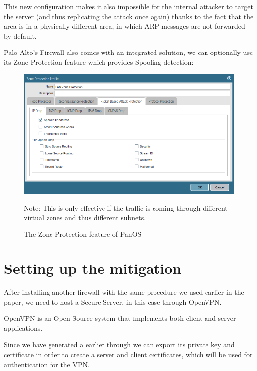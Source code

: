 This new configuration makes it also impossible for the internal attacker to target the  server (and thus replicating the attack once again) thanks to the fact that the  area is in a physically different area, in which ARP messages are not forwarded by default.

Palo Alto's Firewall also comes with an integrated  solution, we can optionally use its Zone Protection feature which provides  Spoofing detection:

\begin{figure}[h!]
 \centering
 \includegraphics[width=13.5cm]{img/zone_protection.png}
 \caption{The Zone Protection feature of PanOS}
 \label{fig: Zone Protection}

Note: This is only effective if the traffic is coming through different virtual zones and thus different subnets.

\end{figure}

\newpage

\section{Setting up the mitigation}

After installing another firewall with the same procedure we used earlier in the paper, we need to host a Secure Server, in this case through OpenVPN.

OpenVPN is an Open Source \cite{openvpn} system that implements both client and server applications.

Since we have generated a  earlier through  we can export its private key and certificate in order to create a server and client certificates, which will be used for authentication for the VPN.

